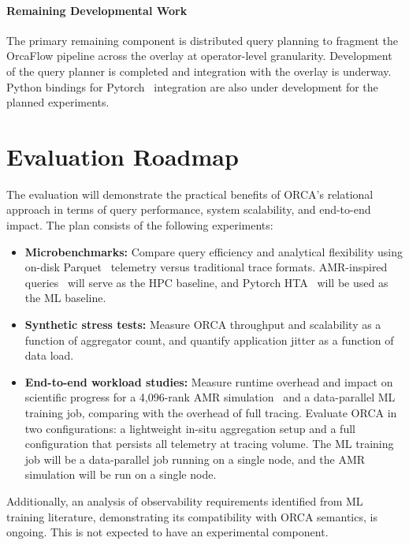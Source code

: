 \paragraph{Remaining Developmental Work}
The primary remaining component is distributed query planning to fragment the OrcaFlow pipeline
across the overlay at operator-level granularity.
Development of the query planner is completed and integration with the overlay is underway.
Python bindings for Pytorch~\cite{Paszk2019:PyTorch} integration are also under development for the
planned experiments.

\section{Evaluation Roadmap}

The evaluation will demonstrate the practical benefits of ORCA's relational approach in terms of
query performance, system scalability, and end-to-end impact.
The plan consists of the following experiments:

\begin{itemize}
  \item \textbf{Microbenchmarks:}
        Compare query efficiency and analytical flexibility using on-disk Parquet~\cite{:Parquet} telemetry
        versus traditional trace formats.
        AMR-inspired queries~\cite{Jain2025:AMR} will serve as the HPC baseline, and Pytorch
        HTA~\cite{:HTA} will be used as the ML baseline.
  \item \textbf{Synthetic stress tests:}
        Measure ORCA throughput and scalability as a function of aggregator count, and quantify application
        jitter as a function of data load.
  \item \textbf{End-to-end workload studies:}
        Measure runtime overhead and impact on scientific progress for a 4,096-rank AMR
        simulation~\cite{Jain2025:AMR} and a data-parallel ML training job, comparing with the overhead of
        full tracing.
        Evaluate ORCA in two configurations: a lightweight in-situ aggregation setup and a full
        configuration that persists all telemetry at tracing volume.
        The ML training job will be a data-parallel job running on a single node, and the AMR simulation
        will be run on a single node.
\end{itemize}

Additionally, an analysis of observability requirements identified from ML training literature,
demonstrating its compatibility with ORCA semantics, is ongoing.
This is not expected to have an experimental component.



